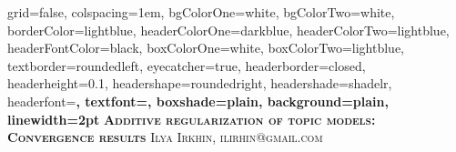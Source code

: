 \documentclass[portrait,final,a1paper,fontscale=0.401]{baposter}
\begin{document}
\begin{poster}%
  {
  grid=false,
  colspacing=1em,
  bgColorOne=white,
  bgColorTwo=white,
  borderColor=lightblue,
  headerColorOne=darkblue,
  headerColorTwo=lightblue,
  headerFontColor=black,
  boxColorOne=white,
  boxColorTwo=lightblue,
  textborder=roundedleft,
  eyecatcher=true,
  headerborder=closed,
  headerheight=0.1\textheight,
  headershape=roundedright,
  headershade=shadelr,
  headerfont=\Large\bf\textsc, %
  textfont={\setlength{\parindent}{0.5em}},
  boxshade=plain,
  background=plain,
  linewidth=2pt
  }
  {} 
  {\bf\textsc{Additive regularization of topic models: \\ Convergence results}\vspace{0.5em}}
  {\textsc{Ilya Irkhin, ilirhin@gmail.com }}
  {%
  }

    


\end{poster}
\end{document}
